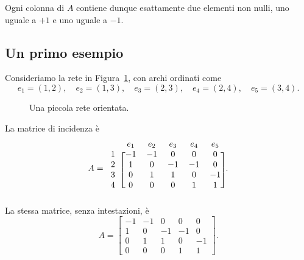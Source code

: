 \documentclass[11pt,a4paper]{article}
\begin{document}
Ogni colonna di $A$ contiene dunque esattamente due elementi non nulli, uno uguale a $+1$ e uno uguale a $-1$.

\subsection{Un primo esempio}

Consideriamo la rete in Figura~\ref{fig:smallnetwork}, con archi ordinati come
\[
  e_1=(1,2),\quad e_2=(1,3),\quad e_3=(2,3),\quad e_4=(2,4),\quad e_5=(3,4).
\]

\begin{figure}[ht]
\centering
{}
\caption{Una piccola rete orientata.}
\label{fig:smallnetwork}
\end{figure}

La matrice di incidenza è
\begin{equation}\label{eq:Aexample}
A=
\begin{blockarray}{cccccc}
 & e_1 & e_2 & e_3 & e_4 & e_5\\
\begin{block}{c[ccccc]}
1 & -1 & -1 &  0 &  0 &  0\\
2 &  1 &  0 & -1 & -1 &  0\\
3 &  0 &  1 &  1 &  0 & -1\\
4 &  0 &  0 &  0 &  1 &  1\\
\end{block}
\end{blockarray}.
\end{equation}
La stessa matrice, senza intestazioni, è
\[
A=\begin{bmatrix}
-1&-1& 0& 0& 0\\
 1& 0&-1&-1& 0\\
 0& 1& 1& 0&-1\\
 0& 0& 0& 1& 1
\end{bmatrix}.
\]
\end{document}
